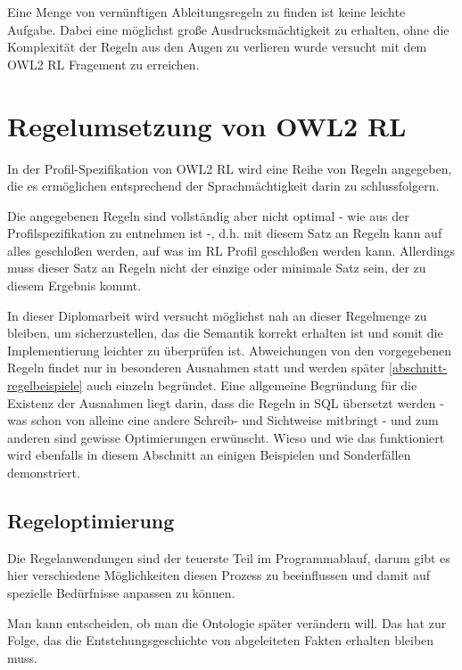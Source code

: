 Eine Menge von vernünftigen Ableitungsregeln zu finden ist keine leichte Aufgabe. Dabei eine möglichst große Ausdrucksmächtigkeit zu erhalten, ohne die Komplexität der Regeln aus den Augen zu verlieren wurde versucht mit dem OWL2 RL Fragement zu erreichen.


\section{Regelumsetzung von OWL2 RL}

In der Profil-Spezifikation von OWL2 RL \cite{OWL2Profiles} wird eine Reihe von Regeln angegeben, die es ermöglichen entsprechend der Sprachmächtigkeit darin zu schlussfolgern.

Die angegebenen Regeln sind vollständig aber nicht optimal - wie aus der Profilspezifikation zu entnehmen ist -, d.h. mit diesem Satz an Regeln kann auf alles geschloßen werden, auf was im RL Profil geschloßen werden kann. Allerdings muss dieser Satz an Regeln nicht der einzige oder minimale Satz sein, der zu diesem Ergebnis kommt.

In dieser Diplomarbeit wird versucht möglichst nah an dieser Regelmenge zu bleiben, um sicherzustellen, das die Semantik korrekt erhalten ist und somit die Implementierung leichter zu überprüfen ist.
Abweichungen von den vorgegebenen Regeln findet nur in besonderen Ausnahmen statt und werden später \ref{abschnitt-regelbeispiele} auch einzeln begründet. Eine allgemeine Begründung für die Existenz der Ausnahmen liegt darin, dass die Regeln in SQL übersetzt werden - was schon von alleine eine andere Schreib- und Sichtweise  mitbringt - und zum anderen sind gewisse Optimierungen erwünscht.
Wieso und wie das funktioniert wird ebenfalls in diesem Abschnitt an einigen Beispielen und Sonderfällen demonstriert.






\subsection{Regeloptimierung}

Die Regelanwendungen sind der teuerste Teil im Programmablauf, darum gibt es hier verschiedene Möglichkeiten diesen Prozess zu beeinflussen und damit auf spezielle Bedürfnisse anpassen zu können.

Man kann entscheiden, ob man die Ontologie später verändern will. Das hat zur Folge, das die Entstehungsgeschichte von abgeleiteten Fakten erhalten bleiben muss.

